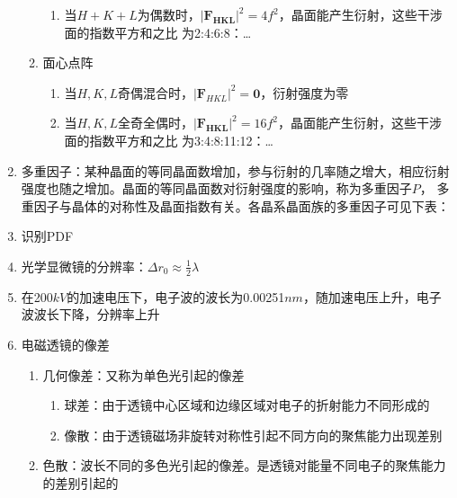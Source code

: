 \documentclass[12pt,a4paper]{article}
\begin{document}
\begin{enumerate}
\begin{enumerate}
\begin{enumerate}
                    \item 当$H+K+L$为偶数时，$\left|\boldsymbol{F}_{\boldsymbol{H K L}}\right|^{2}=4 f^{2}$，晶面能产生衍射，这些干涉面的指数平方和之比
                    为2:4:6:8：\dots
                \end{enumerate}
                \item 面心点阵
                \begin{enumerate}
                    \item 当$H,K,L$奇偶混合时，$\left|\boldsymbol{F}_{H K L}\right|^{2}=\mathbf{0}$，衍射强度为零
                    \item 当$H,K,L$全奇全偶时，$\left|\boldsymbol{F}_{\boldsymbol{H K L}}\right|^{2}=16 f^{2}$，晶面能产生衍射，这些干涉面的指数平方和之比
                    为3:4:8:11:12：\dots
                \end{enumerate}
        \end{enumerate}
        \item 多重因子：某种晶面的等同晶面数增加，参与衍射的几率随之增大，相应衍射强度也随之增加。晶面的等同晶面数对衍射强度的影响，称为多重因子$P$，
        多重因子与晶体的对称性及晶面指数有关。各晶系晶面族的多重因子可见下表：
        \item 识别PDF
        \item 光学显微镜的分辨率：$\Delta r_{0} \approx \frac{1}{2} \lambda$
        \item 在200$kV$的加速电压下，电子波的波长为0.00251$nm$，随加速电压上升，电子波波长下降，分辨率上升
        \item 电磁透镜的像差
        \begin{enumerate}
            \item 几何像差：又称为单色光引起的像差
            \begin{enumerate}
                \item 球差：由于透镜中心区域和边缘区域对电子的折射能力不同形成的
                \item 像散：由于透镜磁场非旋转对称性引起不同方向的聚焦能力出现差别
            \end{enumerate}
            \item 色散：波长不同的多色光引起的像差。是透镜对能量不同电子的聚焦能力的差别引起的
        \end{enumerate}
    \end{enumerate}
\end{document}
